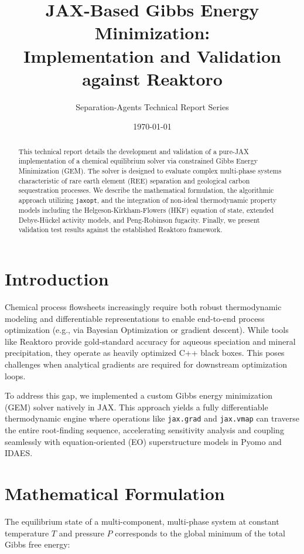 \documentclass[11pt,a4paper]{article}
\title{\textbf{JAX-Based Gibbs Energy Minimization:\\Implementation and Validation against Reaktoro}}
\author{Separation-Agents Technical Report Series}
\date{\today}
\begin{document}
\maketitle

\begin{abstract}
This technical report details the development and validation of a pure-JAX implementation of a chemical equilibrium solver via constrained Gibbs Energy Minimization (GEM). The solver is designed to evaluate complex multi-phase systems characteristic of rare earth element (REE) separation and geological carbon sequestration processes. We describe the mathematical formulation, the algorithmic approach utilizing \texttt{jaxopt}, and the integration of non-ideal thermodynamic property models including the Helgeson-Kirkham-Flowers (HKF) equation of state, extended Debye-Hückel activity models, and Peng-Robinson fugacity. Finally, we present validation test results against the established Reaktoro framework.
\end{abstract}

\section{Introduction}

Chemical process flowsheets increasingly require both robust thermodynamic modeling and differentiable representations to enable end-to-end process optimization (e.g., via Bayesian Optimization or gradient descent). While tools like Reaktoro provide gold-standard accuracy for aqueous speciation and mineral precipitation, they operate as heavily optimized C++ black boxes. This poses challenges when analytical gradients are required for downstream optimization loops. 

To address this gap, we implemented a custom Gibbs energy minimization (GEM) solver natively in JAX. This approach yields a fully differentiable thermodynamic engine where operations like \texttt{jax.grad} and \texttt{jax.vmap} can traverse the entire root-finding sequence, accelerating sensitivity analysis and coupling seamlessly with equation-oriented (EO) superstructure models in Pyomo and IDAES.

\section{Mathematical Formulation}

The equilibrium state of a multi-component, multi-phase system at constant temperature $T$ and pressure $P$ corresponds to the global minimum of the total Gibbs free energy:
\end{document}
